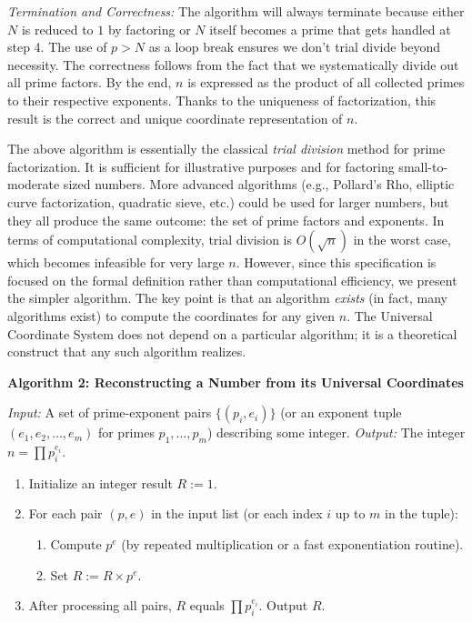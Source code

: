 \documentclass[11pt]{article}
\begin{document}
\noindent\textit{Termination and Correctness:} The algorithm will always terminate because either $N$ is reduced to $1$ by factoring or $N$ itself becomes a prime that gets handled at step 4. The use of $p > N$ as a loop break ensures we don't trial divide beyond necessity. The correctness follows from the fact that we systematically divide out all prime factors. By the end, $n$ is expressed as the product of all collected primes to their respective exponents. Thanks to the uniqueness of factorization, this result is the correct and unique coordinate representation of $n$.

\begin{remark}
The above algorithm is essentially the classical \emph{trial division} method for prime factorization. It is sufficient for illustrative purposes and for factoring small-to-moderate sized numbers. More advanced algorithms (e.g., Pollard's Rho, elliptic curve factorization, quadratic sieve, etc.) could be used for larger numbers, but they all produce the same outcome: the set of prime factors and exponents. In terms of computational complexity, trial division is $O(\sqrt{n})$ in the worst case, which becomes infeasible for very large $n$. However, since this specification is focused on the formal definition rather than computational efficiency, we present the simpler algorithm. The key point is that an algorithm \emph{exists} (in fact, many algorithms exist) to compute the coordinates for any given $n$. The Universal Coordinate System does not depend on a particular algorithm; it is a theoretical construct that any such algorithm realizes.
\end{remark}

\noindent\textbf{Algorithm 2: Reconstructing a Number from its Universal Coordinates}

\noindent\textit{Input:} A set of prime-exponent pairs $\{(p_i, e_i)\}$ (or an exponent tuple $(e_1, e_2, \ldots, e_m)$ for primes $p_1,\dots,p_m$) describing some integer.  
\textit{Output:} The integer $n = \prod p_i^{e_i}$.

\begin{enumerate}[itemsep=0pt, topsep=4pt]
  \item Initialize an integer result $R := 1$.
  \item For each pair $(p, e)$ in the input list (or each index $i$ up to $m$ in the tuple):
  \begin{enumerate}
    \item Compute $p^e$ (by repeated multiplication or a fast exponentiation routine).
    \item Set $R := R \times p^e$.
  \end{enumerate}
  \item After processing all pairs, $R$ equals $\prod p_i^{e_i}$. Output $R$.
\end{enumerate}
\end{document}

